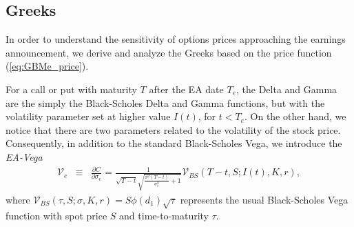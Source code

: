 \documentclass[11pt]{article}
\numberwithin{equation}{section}
\numberwithin{theorem}{section}
\begin{document}




\subsection{Greeks\label{sub:BS_Greeks}}
In order to understand the sensitivity of options prices approaching
the earnings announcement, we derive and analyze the Greeks based
on the price function (\ref{eq:GBMe_price}). 

For a call or put with maturity $T$ after the EA date $T_{e}$, the  {Delta} and  {Gamma} are the simply the Black-Scholes Delta and Gamma functions, but with  the volatility parameter  set at higher value $I(t)$, for $t< T_e$.  On the other hand, we notice that there are two parameters related to the volatility
of the stock price. Consequently, in addition to the standard Black-Scholes   {Vega}, 
we   introduce the \emph{EA-Vega}
\begin{eqnarray*}
\mathcal{V}_{e} & \equiv & \frac{\partial C}{\partial\sigma_{e}}=\frac{1}{\sqrt{T-t}\sqrt{\frac{\sigma^{2}\left(T-t\right)}{\sigma_{e}^{2}}+1}}\mathcal{V}_{BS}\left(T-t,S;I\left(t\right),K,r\right),
\end{eqnarray*}
where $\mathcal{V}_{BS}\left(\tau,S;\sigma,K,r\right)=S\phi\left(d_{1}\right)\sqrt{\tau}$
represents the usual Black-Scholes Vega function with   spot price $S$ and time-to-maturity $\tau$. 
\end{document}

